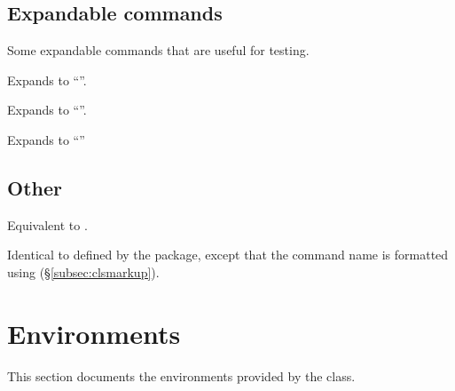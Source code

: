 \documentclass{beerydoc}
\begin{document}
\subsection{Expandable commands}
\label{subec:expandable}

Some expandable commands that are useful for testing.

\begin{codedoc}{\alphabet}
  Expands to \enquote{\alphabet}.
\end{codedoc}

\begin{codedoc}{\digits}
  Expands to \enquote{\digits}.
\end{codedoc}

\begin{codedoc}{\pangram}
  Expands to \enquote{\pangram}
\end{codedoc}

\subsection{Other}
\label{subsec:other}

\begin{codedoc}{\muskipeval}
  Equivalent to .
\end{codedoc}

\begin{codedoc}{\printfontsizecommand}
  Identical to  defined by the 
  package, except that the command name is formatted using 
  (\S\ref{subsec:clsmarkup}).
\end{codedoc}


\section{Environments}
\label{sec:envs}

This section documents the environments provided by the  class.
\end{document}
